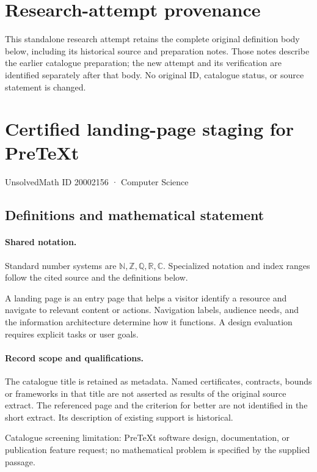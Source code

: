 \documentclass[11pt]{article}
\begin{document}
\section*{Research-attempt provenance}
This standalone research attempt retains the complete original definition body below,
including its historical source and preparation notes. Those notes describe the
earlier catalogue preparation; the new attempt and its verification are identified
separately after that body. No original ID, catalogue status, or source statement is changed.

\section{Certified landing-page staging for PreTeXt}\label{20002156}
{\small UnsolvedMath ID 20002156 · Computer Science}
\subsection{Definitions and mathematical statement}

\paragraph{Shared notation.}Standard number systems are $\mathbb N,\mathbb Z,\mathbb Q,\mathbb R,\mathbb C$. Specialized notation and index ranges follow the cited source and the definitions below.


A landing page is an entry page that helps a visitor identify a resource and navigate to relevant content or actions. Navigation labels, audience needs, and the information architecture determine how it functions. A design evaluation requires explicit tasks or user goals.
\paragraph{Record scope and qualifications.}
The catalogue title is retained as metadata. Named certificates, contracts, bounds or frameworks in that title are not asserted as results of the original source extract.
The referenced page and the criterion for better are not identified in the short extract. Its description of existing support is historical.

Catalogue screening limitation: PreTeXt software design, documentation, or publication feature request; no mathematical problem is specified by the supplied passage.
\end{document}
